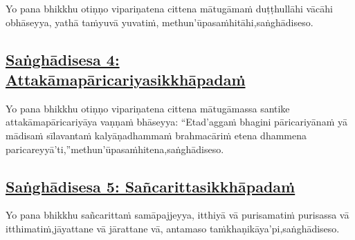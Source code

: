 Yo pana bhikkhu otiṇṇo vipariṇatena cittena mātugāmaṁ duṭṭhullāhi vācāhi obhāseyya, yathā taṁ\makeatletter\hyperlink{endnote41-appendix}\makeatother \thinspace yuvā yuvatiṁ, methun'ūpasaṁhitāhi,\makeatletter\hyperlink{endnote42-appendix}\makeatother \thinspace saṅghādiseso.



\subsection*{\hyperref[comm4]{Saṅghādisesa 4: Attakāmapāricariyasikkhāpadaṁ}}
\label{sd4}

Yo pana bhikkhu otiṇṇo vipariṇatena cittena mātugāmassa santike attakāmapāricariyāya vaṇṇaṁ bhāseyya: ``Etad'aggaṁ bhagini pāricariyānaṁ yā mādisaṁ sīlavantaṁ kalyāṇadhammaṁ brahmacāriṁ etena dhammena paricareyyā'ti,''\makeatletter\hyperlink{endnote-appendix}\makeatother \thinspace methun'ūpasaṁhitena,\makeatletter\hyperlink{endnote-appendix}\makeatother \thinspace saṅghādiseso.



\subsection*{\hyperref[comm5]{Saṅghādisesa 5: Sañcarittasikkhāpadaṁ}}
\label{sd5}

Yo pana bhikkhu sañcarittaṁ samāpajjeyya, itthiyā vā purisamatiṁ purisassa vā itthimatiṁ,\makeatletter\hyperlink{endnote45-appendix}\makeatother \thinspace jāyattane vā jārattane vā, antamaso taṁkhaṇikāya'pi,\makeatletter\hyperlink{endnote46-appendix}\makeatother \thinspace saṅghādiseso.




